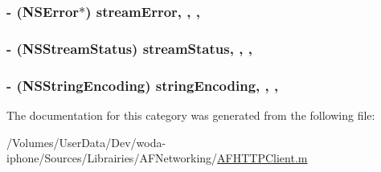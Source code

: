 \hypertarget{category_a_f_multipart_body_stream_07_08_a9726eb064312c0dce3eb57858ed862a9}{
\subsubsection[{stream\-Error}]{\setlength{\rightskip}{0pt plus 5cm}-\/ (N\-S\-Error$\ast$) stream\-Error\hspace{0.3cm}{\ttfamily [read]}, {\ttfamily [write]}, {\ttfamily [nonatomic]}, {\ttfamily [strong]}}}\label{category_a_f_multipart_body_stream_07_08_a9726eb064312c0dce3eb57858ed862a9}
\hypertarget{category_a_f_multipart_body_stream_07_08_ad9f5c15c88c1f3731d0a86d696a39311}{
\subsubsection[{stream\-Status}]{\setlength{\rightskip}{0pt plus 5cm}-\/ (N\-S\-Stream\-Status) stream\-Status\hspace{0.3cm}{\ttfamily [read]}, {\ttfamily [write]}, {\ttfamily [nonatomic]}, {\ttfamily [assign]}}}\label{category_a_f_multipart_body_stream_07_08_ad9f5c15c88c1f3731d0a86d696a39311}
\hypertarget{category_a_f_multipart_body_stream_07_08_a24375ab1dd4d3576eff24e5c9346c83c}{
\subsubsection[{string\-Encoding}]{\setlength{\rightskip}{0pt plus 5cm}-\/ (N\-S\-String\-Encoding) string\-Encoding\hspace{0.3cm}{\ttfamily [read]}, {\ttfamily [write]}, {\ttfamily [nonatomic]}, {\ttfamily [assign]}}}\label{category_a_f_multipart_body_stream_07_08_a24375ab1dd4d3576eff24e5c9346c83c}


The documentation for this category was generated from the following file\-:\begin{DoxyCompactItemize}
\item 
/\-Volumes/\-User\-Data/\-Dev/woda-\/iphone/\-Sources/\-Librairies/\-A\-F\-Networking/\hyperlink{_a_f_h_t_t_p_client_8m}{A\-F\-H\-T\-T\-P\-Client.\-m}\end{DoxyCompactItemize}

